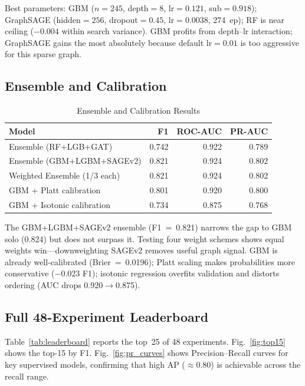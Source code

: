 \documentclass[conference]{IEEEtran}
\begin{document}
Best parameters: GBM ($n{=}245$, depth$=8$, lr$=0.121$, sub$=0.918$);
GraphSAGE (hidden$=256$, dropout$=0.45$, lr$=0.0038$, 274~ep); RF is near
ceiling ($-0.004$ within search variance).  GBM profits from depth--lr
interaction; GraphSAGE gains the most absolutely because default lr$=0.01$
is too aggressive for this sparse graph.

\subsection{Ensemble and Calibration}

\begin{table}[htbp]
\centering
\caption{Ensemble and Calibration Results}
\label{tab:ensemble}
\renewcommand{\arraystretch}{1.1}
\begin{tabular}{@{}lrrr@{}}
\toprule
Model & F1 & ROC-AUC & PR-AUC \\
\midrule
Ensemble (RF+LGB+GAT)         & 0.742 & 0.922 & 0.789 \\
Ensemble (GBM+LGBM+SAGEv2)   & 0.821 & 0.924 & 0.802 \\
Weighted Ensemble (1/3 each)  & 0.821 & 0.924 & 0.802 \\
GBM + Platt calibration       & 0.801 & 0.920 & 0.800 \\
GBM + Isotonic calibration    & 0.734 & 0.875 & 0.768 \\
\bottomrule
\end{tabular}
\end{table}

The GBM+LGBM+SAGEv2 ensemble (F1~=~0.821) narrows the gap to GBM solo
(0.824) but does not surpass it.  Testing four weight schemes shows equal
weights win---downweighting SAGEv2 removes useful graph signal.  GBM is
already well-calibrated (Brier~=~0.0196); Platt scaling makes probabilities
more conservative ($-0.023$ F1); isotonic regression overfits validation and
distorts ordering (AUC drops 0.920$\to$0.875).

\subsection{Full 48-Experiment Leaderboard}

Table~\ref{tab:leaderboard} reports the top~25 of 48 experiments.
Fig.~\ref{fig:top15} shows the top-15 by F1.
Fig.~\ref{fig:pr_curves} shows Precision--Recall curves for key
supervised models, confirming that high AP ($\approx$0.80) is
achievable across the recall range.
\end{document}
